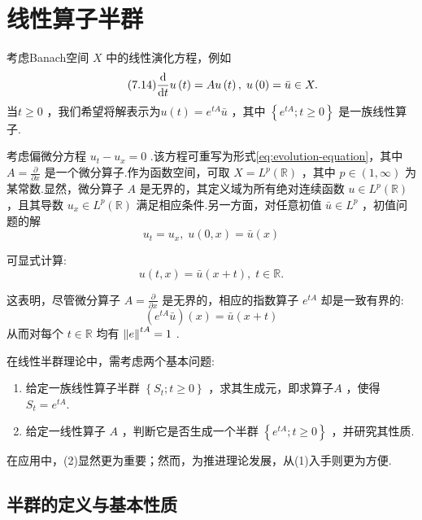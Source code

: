 \section{线性算子半群}

考虑Banach空间 $X$ 中的线性演化方程，例如
\begin{equation}\tag{7.14}\label{eq:evolution-equation}
\frac{\mathop{}\!\mathrm{d}}{\mathop{}\!\mathrm{d} t}u\left( t\right)  = {Au}\left( t\right) ,\;u\left( 0\right)  = \bar{u} \in  X.
\end{equation}
当$t \geq  0$ ，我们希望将解表示为$u\left( t\right)  = {e}^{tA}\bar{u}$ ，其中 $\left\{  {{e}^{tA};t \geq  0}\right\}$ 是一族线性算子.

\begin{instance}\label{ins:transport-equation}
考虑偏微分方程 ${u}_{t} - {u}_{x} = 0$ .该方程可重写为形式\eqref{eq:evolution-equation}，其中 $A = \frac{\partial }{\partial x}$ 是一个微分算子.作为函数空间，可取 $X = {L}^{p}\left( \mathbb{R}\right)$ ，其中 $p \in (1,\infty)$ 为某常数.显然，微分算子 $A$ 是无界的，其定义域为所有绝对连续函数 $u \in  {L}^{p}\left( \mathbb{R}\right)$ ，且其导数 ${u}_{x} \in  {L}^{p}\left( \mathbb{R}\right)$ 满足相应条件.另一方面，对任意初值 $\bar{u} \in  {L}^{p}$ ，初值问题的解
\[
{u}_{t} = {u}_{x},\;u\left( {0,x}\right)  = \bar{u}\left( x\right)
\]

可显式计算:
\[
u\left( {t,x}\right)  = \bar{u}\left( {x + t}\right) ,\;t \in  \mathbb{R}.
\]

这表明，尽管微分算子 $A = \frac{\partial }{\partial x}$ 是无界的，相应的指数算子 ${e}^{tA}$ 却是一致有界的:
\[
\left( {{e}^{tA}\bar{u}}\right) \left( x\right)  = \bar{u}\left( {x + t}\right)
\]
从而对每个 $t \in  \mathbb{R}$ 均有 $\norm{e}^{tA} = 1$ .
\end{instance}

在线性半群理论中，需考虑两个基本问题:

\begin{enumerate}[(1)]
    \item 给定一族线性算子半群 $\left\{  {{S}_{t};t \geq  0}\right\}$ ，求其生成元，即求算子$A$ ，使得${S}_{t} = {e}^{tA}$.
    \item 给定一线性算子 $A$ ，判断它是否生成一个半群 $\left\{  {{e}^{tA};t \geq  0}\right\}$ ，并研究其性质.
\end{enumerate}

在应用中，(2)显然更为重要；然而，为推进理论发展，从(1)入手则更为方便.

\subsection{半群的定义与基本性质}

